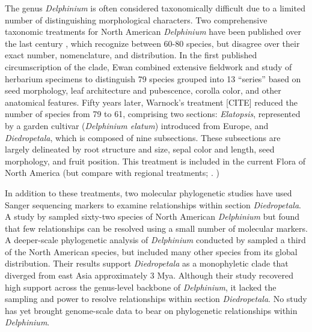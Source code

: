 \documentclass[11pt]{article}
\begin{document}
The genus \emph{Delphinium} is often considered taxonomically difficult due to a 
limited number of 
distinguishing
morphological characters. Two comprehensive 
taxonomic treatments for North American \emph{Delphinium} have been published over 
the last century \citep{benson_synopsis_1946,ewan_1945, warnock_1997}, %
which recognize between 60-80 species, but disagree over their exact number, 
nomenclature, and distribution. 
% 
In the first published circumscription of the clade, Ewan combined extensive 
fieldwork and study of herbarium specimens to distinguish 79 species grouped 
into 13 “series” based on seed morphology, leaf architecture and pubescence, 
corolla color, and other anatomical features. 
% 
Fifty years later, Warnock’s treatment [CITE] reduced the number of species 
from 79 to 61, comprising two sections: \emph{Elatopsis}, represented by a garden 
cultivar (\emph{Delphinium elatum}) introduced from Europe, and 
\emph{Diedropetala}, which is composed of nine subsections.
%
These subsections are largely delineated by root structure and size, 
sepal color and length, seed morphology, and fruit position.
% 
This treatment is included in the current Flora of North America 
\citep{...} (but compare with regional treatments;
\cite{ackerfield_flora_2022,chambers_comments_2018,holmgren_2012,koontz_2012}.
)


In addition to these treatments, two molecular phylogenetic studies have used
Sanger sequencing markers to examine relationships within section \emph{Diedropetala}.
% 
A study by \citet{koontz_using_2004} sampled sixty-two species of 
North American \emph{Delphinium} but found that few relationships can
be resolved using a small number of molecular markers. 
% 
A deeper-scale phylogenetic analysis of \emph{Delphinium} conducted
by \cite{jabbour_phylogeny_2012} sampled a third of the North American species,
but included many other species from its global distribution.
Their results support \emph{Diedropetala} as a monophyletic clade that diverged
from east Asia approximately 3 Mya.
% 
Although their study recovered high support across the genus-level 
backbone of \emph{Delphinium}, it lacked the sampling and power to 
resolve relationships within section \emph{Diedropetala}.
% 
No study has yet brought genome-scale data to bear on phylogenetic 
relationships within \emph{Delphinium}.
\end{document}
